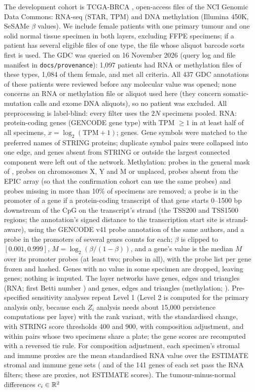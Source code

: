 The development cohort is TCGA-BRCA \citep{tcga2012}, open-access files of the NCI Genomic Data Commons: RNA-seq (STAR, TPM) and DNA methylation (Illumina 450K, SeSAMe $\beta$ values). We include female patients with one primary tumour and one solid normal tissue specimen in both layers, excluding FFPE specimens; if a patient has several eligible files of one type, the file whose aliquot barcode sorts first is used. The GDC was queried on 16 November 2026 (query log and file manifest in \texttt{docs/provenance}): 1{,}097 patients had RNA or methylation files of these types, 1{,}084 of them female, and \cohortN{} met all criteria. All 437 GDC annotations of these patients \citep{gdcannotations} were reviewed before any molecular value was opened; none concerns an RNA or methylation file or aliquot used here (they concern somatic-mutation calls and exome DNA aliquots), so no patient was excluded. All preprocessing is label-blind: every filter uses the $2N$ specimens pooled. RNA: protein-coding genes (GENCODE gene type) with TPM $\ge1$ in at least half of all specimens, $x=\log_2(\mathrm{TPM}+1)$; \rnaGenes{} genes. Gene symbols were matched to the preferred names of STRING proteins; duplicate symbol pairs were collapsed into one edge, and genes absent from STRING or outside the largest connected component were left out of the network. Methylation: probes in the general mask of \citet{zhou2017}, probes on chromosomes X, Y and M or unplaced, probes absent from the EPIC array (so that the confirmation cohort can use the same probes) and probes missing in more than 10\% of specimens are removed; a probe is in the promoter of a gene if a protein-coding transcript of that gene starts 0--1500 bp downstream of the CpG on the transcript's strand (the TSS200 and TSS1500 regions; the annotation's signed distance to the transcription start site is strand-aware), using the GENCODE v41 probe annotation of the same authors, and a probe in the promoters of several genes counts for each; $\beta$ is clipped to $[0.001,0.999]$, $M=\log_2(\beta/(1-\beta))$, and a gene's value is the median $M$ over its promoter probes (at least two; \methPromoterProbes{} probes in all), with the probe list per gene frozen and hashed. Genes with no value in some specimen are dropped, leaving \methGenes{} genes; nothing is imputed. The layer networks have \rnaNetV{} genes, \rnaNetE{} edges and \rnaNetT{} triangles (RNA; first Betti number \rnaNetBone{}) and \methNetV{} genes, \methNetE{} edges and \methNetT{} triangles (methylation; \methNetBone{}). Pre-specified sensitivity analyses repeat Level 1 (Level 2 is computed for the primary analysis only, because each $Z_i$ analysis needs about 15{,}000 persistence computations per layer) with the rank variant, with the standardised change, with STRING score thresholds 400 and 900, with composition adjustment, and within pairs whose two specimens share a plate; the gene scores are recomputed with a reversed tie rule. For composition adjustment, each specimen's stromal and immune proxies are the mean standardised RNA value over the ESTIMATE stromal and immune gene sets \citep{yoshihara2013} (\estimateStromal{} and \estimateImmune{} of the 141 genes of each set pass the RNA filters; these are proxies, not ESTIMATE scores). The tumour-minus-normal differences $c_i\in\mathbb{R}^2$ 